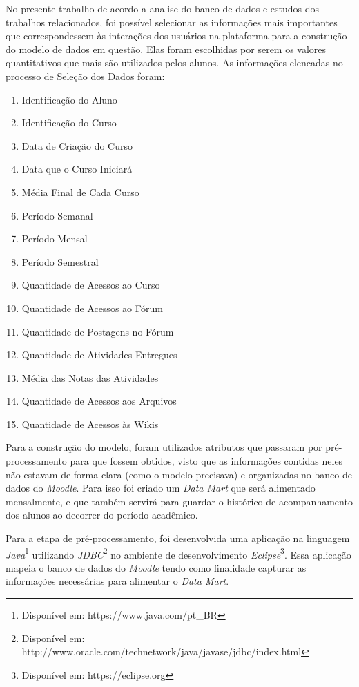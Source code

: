 No presente trabalho de acordo a analise do banco de dados e estudos dos trabalhos relacionados, foi possível selecionar as informações mais importantes que correspondessem às interações dos usuários na plataforma para a construção do modelo de dados em questão. Elas foram escolhidas por serem os valores quantitativos que mais são utilizados pelos alunos. As informações elencadas no processo de Seleção dos Dados foram:

\begin{enumerate}
\item Identificação do Aluno
\item Identificação do Curso
\item Data de Criação do Curso
\item Data que o Curso Iniciará
\item Média Final de Cada Curso
\item Período Semanal
\item Período Mensal
\item Período Semestral
\item Quantidade de Acessos ao Curso
\item Quantidade de Acessos ao Fórum
\item Quantidade de Postagens no Fórum
\item Quantidade de Atividades Entregues
\item Média das Notas das Atividades
\item Quantidade de Acessos aos Arquivos
\item Quantidade de Acessos às Wikis
\end{enumerate}


Para a construção do modelo, foram utilizados atributos que passaram por pré-processamento para que fossem obtidos, visto que as informações contidas neles não estavam de forma clara (como o modelo precisava) e organizadas no banco de dados do \textit{Moodle}. Para isso foi criado um \textit{Data Mart} que será alimentado mensalmente, e que também servirá para guardar o histórico de acompanhamento dos alunos ao decorrer do período acadêmico.

Para a etapa de pré-processamento, foi desenvolvida uma aplicação na linguagem \textit{Java}\footnote{Disponível em: https://www.java.com/pt\_BR} utilizando \textit{JDBC}\footnote{Disponível em: http://www.oracle.com/technetwork/java/javase/jdbc/index.html} no ambiente de desenvolvimento \textit{Eclipse}\footnote{Disponível em: https://eclipse.org}. Essa aplicação mapeia o banco de dados do \textit{Moodle} tendo como finalidade capturar as informações necessárias para alimentar o \textit{Data Mart}.

